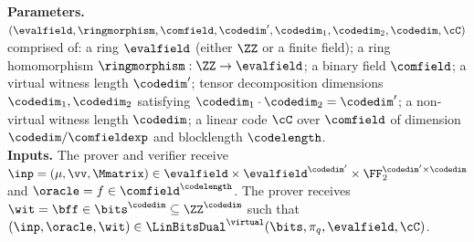 \begin{construction}\label{c:virtual_iop}
\textbf{Parameters.} $(\evalfield,\ringmorphism,\comfield,\codedim',\codedim_1,\codedim_2, \codedim, \cC)$ comprised of: a ring $\evalfield$ (either $\ZZ$ or a finite field); a ring homomorphism $\ringmorphism:\ZZ \to \evalfield$; a binary field $\comfield$; a virtual witness length $\codedim'$; tensor decomposition dimensions $\codedim_1, \codedim_2$ satisfying $\codedim_1\cdot \codedim_2 = \codedim'$; a non-virtual witness length $\codedim$; a linear code $\cC$ over $\comfield$ of dimension $\codedim/\comfieldexp$ and blocklength $\codelength$.\\ 

\noindent \textbf{Inputs.}
The prover and verifier receive $\inp=(\mu, \vv,\Mmatrix)\in \evalfield \times \evalfield^{\codedim'} \times \FF_2^{\codedim'\times\codedim}$ and  $\oracle= f \in \comfield^\codelength$. The prover receives $\wit= \bff\in \bits^\codedim \subseteq \ZZ^\codedim$ such that $(\inp,\oracle, \wit) \in \LinBitsDual^\virtual(\bits,\pi_q, \evalfield,\cC)$.  %




\end{construction}
